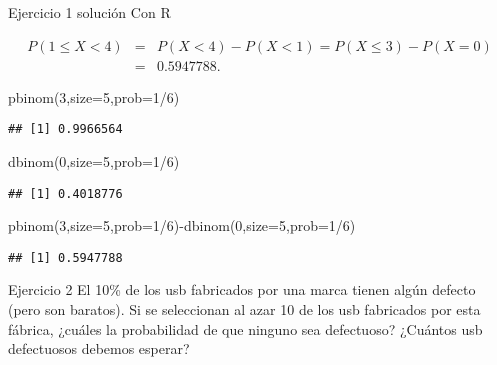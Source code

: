\documentclass[
  ignorenonframetext,
]{beamer}
\newenvironment{Shaded}{\begin{snugshade}}{\end{snugshade}}
\newcommand{\AttributeTok}[1]{\textcolor[rgb]{0.77,0.63,0.00}{#1}}
\newcommand{\DecValTok}[1]{\textcolor[rgb]{0.00,0.00,0.81}{#1}}
\newcommand{\FunctionTok}[1]{\textcolor[rgb]{0.00,0.00,0.00}{#1}}
\newcommand{\NormalTok}[1]{#1}
\newcommand{\SpecialCharTok}[1]{\textcolor[rgb]{0.00,0.00,0.00}{#1}}
\begin{document}
\begin{frame}[fragile]{Ejercicio 1 solución}
\protect\hypertarget{ejercicio-1-soluciuxf3n-2}{}
Con R

\[
\begin{array}{lll}
P(1\leq X< 4)&=& P(X<4)-P(X<1)=P(X\leq 3)-P(X=0)\\&=&0.5947788.
\end{array}
\]

\begin{Shaded}
\begin{Highlighting}[]
\FunctionTok{pbinom}\NormalTok{(}\DecValTok{3}\NormalTok{,}\AttributeTok{size=}\DecValTok{5}\NormalTok{,}\AttributeTok{prob=}\DecValTok{1}\SpecialCharTok{/}\DecValTok{6}\NormalTok{)}
\end{Highlighting}
\end{Shaded}

\begin{verbatim}
## [1] 0.9966564
\end{verbatim}

\begin{Shaded}
\begin{Highlighting}[]
\FunctionTok{dbinom}\NormalTok{(}\DecValTok{0}\NormalTok{,}\AttributeTok{size=}\DecValTok{5}\NormalTok{,}\AttributeTok{prob=}\DecValTok{1}\SpecialCharTok{/}\DecValTok{6}\NormalTok{)}
\end{Highlighting}
\end{Shaded}

\begin{verbatim}
## [1] 0.4018776
\end{verbatim}

\begin{Shaded}
\begin{Highlighting}[]
\FunctionTok{pbinom}\NormalTok{(}\DecValTok{3}\NormalTok{,}\AttributeTok{size=}\DecValTok{5}\NormalTok{,}\AttributeTok{prob=}\DecValTok{1}\SpecialCharTok{/}\DecValTok{6}\NormalTok{)}\SpecialCharTok{{-}}\FunctionTok{dbinom}\NormalTok{(}\DecValTok{0}\NormalTok{,}\AttributeTok{size=}\DecValTok{5}\NormalTok{,}\AttributeTok{prob=}\DecValTok{1}\SpecialCharTok{/}\DecValTok{6}\NormalTok{)}
\end{Highlighting}
\end{Shaded}

\begin{verbatim}
## [1] 0.5947788
\end{verbatim}
\end{frame}

\begin{frame}{Ejercicio 2}
\protect\hypertarget{ejercicio-2}{}
El 10\% de los usb fabricados por una marca tienen algún defecto (pero
son baratos). Si se seleccionan al azar 10 de los usb fabricados por
esta fábrica, ¿cuáles la probabilidad de que ninguno sea defectuoso?
¿Cuántos usb defectuosos debemos esperar?
\end{frame}
\end{document}
